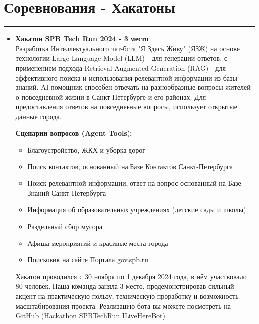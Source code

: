 \documentclass[a4paper,14pt]{article}
\begin{document}
\section*{Соревнования - Хакатоны}
\hrule
\vspace{0.5em}
\begin{itemize}
    \item \textbf{Хакатон SPB Tech Run 2024 - 3 место} \\
    Разработка Интеллектуального чат-бота "Я Здесь Живу" (ЯЗЖ) на основе технологии Large Language Model (LLM) - для генерации ответов, с применением подхода Retrieval-Augmented Generation (RAG) - для эффективного поиска и использования релевантной информации из базы знаний. AI-помощник способен отвечать на разнообразные вопросы жителей о повседневной жизни в Санкт-Петербурге и его районах. Для предоставления ответов на повседневные вопросы, использует открытые данные города.

    \textbf{Сценарии вопросов (Agent Tools):}
\begin{itemize}
        \item Благоустройство, ЖКХ и уборка дорог
        \item Поиск контактов, основанный на Базе Контактов Санкт-Петербурга
        \item Поиск релевантной информации, ответ на вопрос основанный на Базе Знаний Санкт-Петербурга
        \item Информация об образовательных учреждениях (детские сады и школы)
        \item Раздельный сбор мусора
        \item Афиша мероприятий и красивые места города
        \item Поисковик на сайте \href{https://www.gov.spb.ru/}{Портала gov.spb.ru}
\end{itemize}
    Хакатон проводился с 30 ноября по 1 декабря 2024 года, в нём участвовало 80 человек. Наша команда заняла 3 место, продемонстрировав сильный акцент на практическую пользу, техническую проработку и возможность масштабирования проекта.
    Реализацию бота вы можете посмотреть на \href{https://github.com/Denigmma/Hackathon_SPBTechRun_ILiveHereBot}{GitHub (Hackathon SPBTechRun ILiveHereBot)}
\end{itemize}
\end{document}
